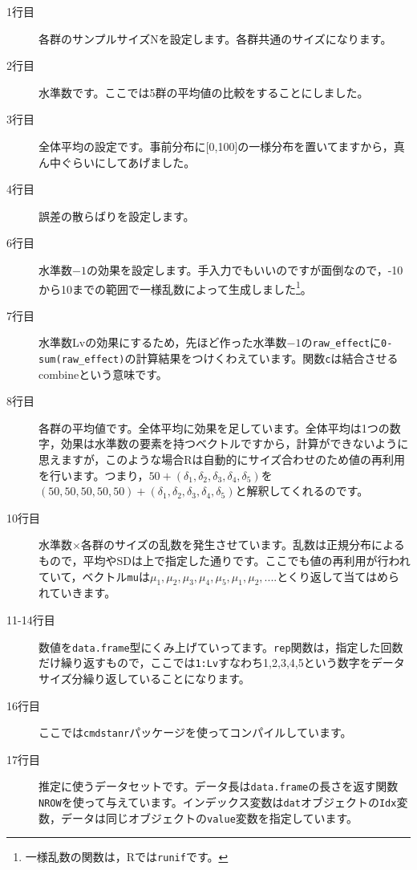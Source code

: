 \begin{description}
	\item[1行目] 各群のサンプルサイズNを設定します。各群共通のサイズになります。
	\item[2行目] 水準数です。ここでは5群の平均値の比較をすることにしました。
	\item[3行目] 全体平均の設定です。事前分布に[0,100]の一様分布を置いてますから，真ん中ぐらいにしてあげました。
	\item[4行目] 誤差の散らばりを設定します。
	\item[6行目] 水準数$-1$の効果を設定します。手入力でもいいのですが面倒なので，-10から10までの範囲で一様乱数によって生成しました\footnote{一様乱数の関数は，Rでは\texttt{runif}です。}。
	\item[7行目] 水準数Lvの効果にするため，先ほど作った水準数$-1$の\verb|raw_effect|に\verb|0-sum(raw_effect)|の計算結果をつけくわえています。関数\texttt{c}は結合させるcombineという意味です。
	\item[8行目] 各群の平均値です。全体平均に効果を足しています。全体平均は1つの数字，効果は水準数の要素を持つベクトルですから，計算ができないように思えますが，このような場合Rは自動的にサイズ合わせのため値の再利用を行います。つまり，$50+(\delta_1,\delta_2,\delta_3,\delta_4,\delta_5)$を$(50,50,50,50,50)+(\delta_1,\delta_2,\delta_3,\delta_4,\delta_5)$と解釈してくれるのです。
	\item[10行目] 水準数$\times$各群のサイズの乱数を発生させています。乱数は正規分布によるもので，平均やSDは上で指定した通りです。ここでも値の再利用が行われていて，ベクトル\verb|mu|は$\mu_1,\mu_2,\mu_3,\mu_4,\mu_5,\mu_1,\mu_2,....$とくり返して当てはめられていきます。
	\item[11-14行目] 数値を\verb|data.frame|型にくみ上げていってます。\verb|rep|関数は，指定した回数だけ繰り返すもので，ここでは\verb|1:Lv|すなわち1,2,3,4,5という数字をデータサイズ分繰り返していることになります。
	\item[16行目] ここでは\verb|cmdstanr|パッケージを使ってコンパイルしています。
	\item[17行目] 推定に使うデータセットです。データ長は\verb|data.frame|の長さを返す関数\verb|NROW|を使って与えています。インデックス変数は\verb|dat|オブジェクトの\verb|Idx|変数，データは同じオブジェクトの\verb|value|変数を指定しています。
\end{description}
